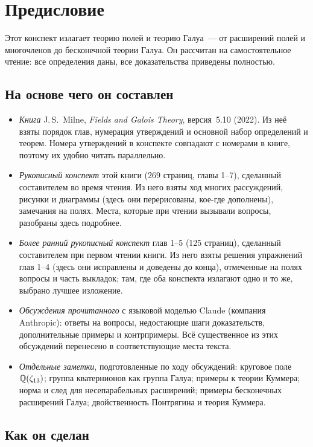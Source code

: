 \chapter{Предисловие}

Этот конспект излагает теорию полей и теорию Галуа~--- от расширений полей и многочленов до бесконечной теории
Галуа. Он рассчитан на самостоятельное чтение: все определения даны, все доказательства приведены полностью.

\section*{На основе чего он составлен}

\begin{itemize}[leftmargin=*]
\item \emph{Книга} J.\,S.~Milne, \emph{Fields and Galois Theory}, версия~5.10 (2022). Из неё взяты порядок глав,
нумерация утверждений и основной набор определений и теорем. Номера утверждений в конспекте совпадают с номерами в
книге, поэтому их удобно читать параллельно.
\item \emph{Рукописный конспект} этой книги (269 страниц, главы 1--7), сделанный составителем во время чтения. Из него
взяты ход многих рассуждений, рисунки и диаграммы (здесь они перерисованы, кое-где дополнены), замечания на полях. Места,
которые при чтении вызывали вопросы, разобраны здесь подробнее.
\item \emph{Более ранний рукописный конспект} глав 1--5 (125 страниц), сделанный составителем при первом чтении книги.
Из него взяты решения упражнений глав 1--4 (здесь они исправлены и доведены до конца), отмеченные на полях вопросы и
часть выкладок; там, где оба конспекта излагают одно и то же, выбрано лучшее изложение.
\item \emph{Обсуждения прочитанного} с языковой моделью Claude (компания Anthropic): ответы на вопросы, недостающие
шаги доказательств, дополнительные примеры и контрпримеры. Всё существенное из этих обсуждений перенесено в
соответствующие места текста.
\item \emph{Отдельные заметки}, подготовленные по ходу обсуждений: круговое поле $\mathbb Q(\zeta_{13})$; группа кватернионов
как группа Галуа; примеры к теории Куммера; норма и след для несепарабельных расширений; примеры бесконечных
расширений Галуа; двойственность Понтрягина и теория Куммера.
\end{itemize}

\section*{Как он сделан}

